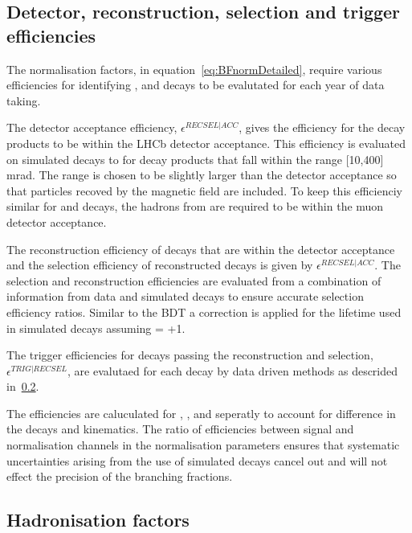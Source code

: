 \subsection{Detector, reconstruction, selection and trigger efficiencies}
The normalisation factors, in equation~\ref{eq:BFnormDetailed}, require various efficiencies for identifying \bmumu, \bdkpi and \bujpsik decays to be evalutated for each year of data taking. %

The detector acceptance efficiency, $\epsilon^{RECSEL|ACC}$, gives the efficiency for the decay products to be within the LHCb detector acceptance. This efficiency is evaluated on simulated decays to for decay products that fall within the range [10,400] mrad. The range is chosen to be slightly larger than the detector acceptance so that particles recoved by the magnetic field are included. To keep this efficienciy similar for \bmumu and \bdkpi decays, the hadrons from \bdkpi are required to be within the muon detector acceptance. 

The reconstruction efficiency of decays that are within the detector acceptance and the selection efficiency of reconstructed decays is given by $\epsilon^{RECSEL|ACC}$. The selection and reconstruction efficiencies are evaluated from a combination of information from data and simulated decays to ensure accurate selection efficiency ratios. Similar to the \bsmumu BDT \pdf a correction is applied for the lifetime used in simulated \bsmumu decays assuming \ADG = +1. 

The trigger efficiencies for decays passing the reconstruction and selection, $\epsilon^{TRIG|RECSEL}$, are evalutaed for each decay by data driven methods as descrided in~\ref{}. 

The efficiencies are caluculated for \bsmumu, \bdmumu, \bdkpi and \bujpsik seperatly to account for difference in the decays and kinematics. The ratio of efficiencies between signal and normalisation channels in the normalisation parameters ensures that systematic uncertainties arising from the use of simulated decays cancel out and will not effect the precision of the \bmumu branching fractions.

\subsection{Hadronisation factors}

